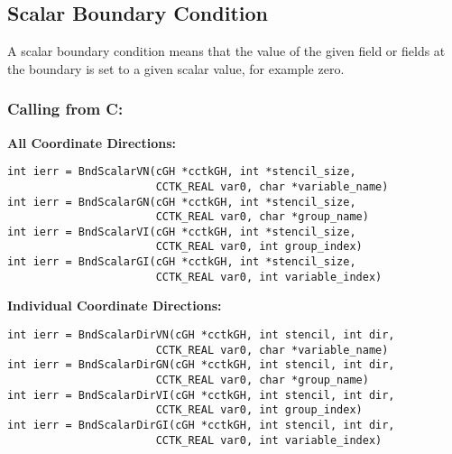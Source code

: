 \documentclass{article}
\begin{document}
\subsection{Scalar Boundary Condition}

A scalar boundary condition means that the value of the given 
field or fields at the boundary is set to a given scalar value, for 
example zero. 

\subsubsection*{Calling from C:}

{\bf All Coordinate Directions:}
\begin{verbatim}
int ierr = BndScalarVN(cGH *cctkGH, int *stencil_size,  
                       CCTK_REAL var0, char *variable_name)
int ierr = BndScalarGN(cGH *cctkGH, int *stencil_size,  
                       CCTK_REAL var0, char *group_name)
int ierr = BndScalarVI(cGH *cctkGH, int *stencil_size,  
                       CCTK_REAL var0, int group_index)
int ierr = BndScalarGI(cGH *cctkGH, int *stencil_size,  
                       CCTK_REAL var0, int variable_index)
\end{verbatim}
{\bf Individual Coordinate Directions:}
\begin{verbatim}
int ierr = BndScalarDirVN(cGH *cctkGH, int stencil, int dir,
                       CCTK_REAL var0, char *variable_name)
int ierr = BndScalarDirGN(cGH *cctkGH, int stencil, int dir,
                       CCTK_REAL var0, char *group_name)
int ierr = BndScalarDirVI(cGH *cctkGH, int stencil, int dir,
                       CCTK_REAL var0, int group_index)
int ierr = BndScalarDirGI(cGH *cctkGH, int stencil, int dir,
                       CCTK_REAL var0, int variable_index)
\end{verbatim}
\end{document}
